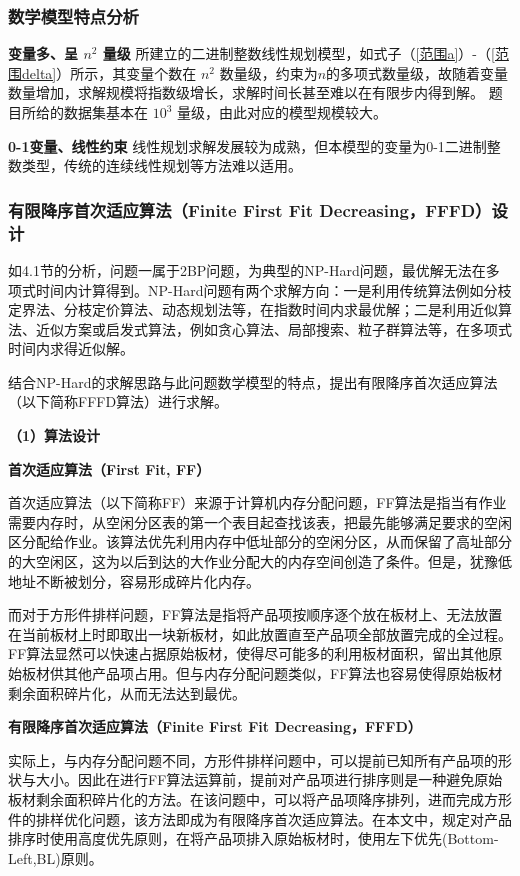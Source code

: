 \documentclass[bwprint]{gmcmthesis}
\begin{document}
\subsubsection{数学模型特点分析}

	\textbf{变量多、呈 $ n^2 $ 量级} \quad 所建立的二进制整数线性规划模型，如式子（\ref{范围a}）-（\ref{范围delta}）所示，其变量个数在 $ n^2 $ 数量级，约束为$ n $的多项式数量级，故随着变量数量增加，求解规模将指数级增长，求解时间长甚至难以在有限步内得到解。 题目所给的数据集基本在 $ 10^3 $ 量级，由此对应的模型规模较大。
	
	\textbf{0-1变量、线性约束} \quad 线性规划求解发展较为成熟，但本模型的变量为0-1二进制整数类型，传统的连续线性规划等方法难以适用。
	

\subsubsection{有限降序首次适应算法（Finite First Fit Decreasing，FFFD）设计}
	
	如4.1节的分析，问题一属于2BP问题，为典型的NP-Hard问题，最优解无法在多项式时间内计算得到。NP-Hard问题有两个求解方向：一是利用传统算法例如分枝定界法、分枝定价算法、动态规划法等，在指数时间内求最优解；二是利用近似算法、近似方案或启发式算法，例如贪心算法、局部搜索、粒子群算法等，在多项式时间内求得近似解。
	
	结合NP-Hard的求解思路与此问题数学模型的特点，提出有限降序首次适应算法（以下简称FFFD算法）进行求解。
	
	\textbf{（1）算法设计}	
	
    \textbf{首次适应算法（First Fit, FF）}	

    首次适应算法（以下简称FF）来源于计算机内存分配问题，FF算法是指当有作业需要内存时，从空闲分区表的第一个表目起查找该表，把最先能够满足要求的空闲区分配给作业。该算法优先利用内存中低址部分的空闲分区，从而保留了高址部分的大空闲区，这为以后到达的大作业分配大的内存空间创造了条件。但是，犹豫低地址不断被划分，容易形成碎片化内存。

    而对于方形件排样问题，FF算法是指将产品项按顺序逐个放在板材上、无法放置在当前板材上时即取出一块新板材，如此放置直至产品项全部放置完成的全过程。FF算法显然可以快速占据原始板材，使得尽可能多的利用板材面积，留出其他原始板材供其他产品项占用。但与内存分配问题类似，FF算法也容易使得原始板材剩余面积碎片化，从而无法达到最优。

    \textbf{有限降序首次适应算法（Finite First Fit Decreasing，FFFD）}	
    
    实际上，与内存分配问题不同，方形件排样问题中，可以提前已知所有产品项的形状与大小。因此在进行FF算法运算前，提前对产品项进行排序则是一种避免原始板材剩余面积碎片化的方法。在该问题中，可以将产品项降序排列，进而完成方形件的排样优化问题，该方法即成为有限降序首次适应算法。在本文中，规定对产品排序时使用高度优先原则，在将产品项排入原始板材时，使用左下优先(Bottom-Left,BL)原则。
\end{document}
